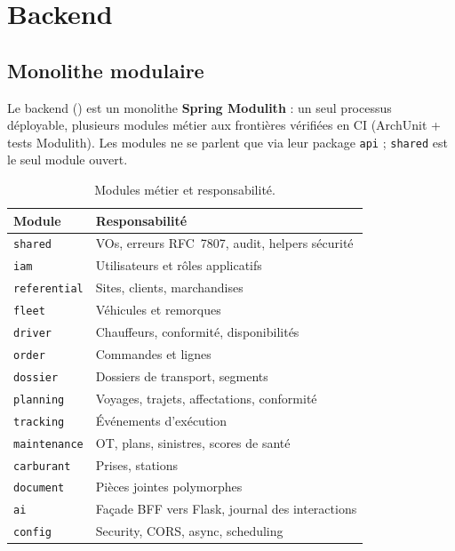 \chapter{Backend}
\label{chap:backend}

\section{Monolithe modulaire}

Le backend () est un monolithe \textbf{Spring Modulith} : un seul processus déployable, plusieurs modules métier aux frontières vérifiées en CI (ArchUnit + tests Modulith). Les modules ne se parlent que via leur package \texttt{api} ; \texttt{shared} est le seul module ouvert.


\begin{table}[ht]
\centering
\caption{Modules métier et responsabilité.}
\label{tab:modules}
\begin{tabular}{@{}lp{8.2cm}@{}}
\toprule
Module & Responsabilité \\
\midrule
\texttt{shared} & VOs, erreurs RFC~7807, audit, helpers sécurité \\
\texttt{iam} & Utilisateurs et rôles applicatifs \\
\texttt{referential} & Sites, clients, marchandises \\
\texttt{fleet} & Véhicules et remorques \\
\texttt{driver} & Chauffeurs, conformité, disponibilités \\
\texttt{order} & Commandes et lignes \\
\texttt{dossier} & Dossiers de transport, segments \\
\texttt{planning} & Voyages, trajets, affectations, conformité \\
\texttt{tracking} & Événements d'exécution \\
\texttt{maintenance} & OT, plans, sinistres, scores de santé \\
\texttt{carburant} & Prises, stations \\
\texttt{document} & Pièces jointes polymorphes \\
\texttt{ai} & Façade BFF vers Flask, journal des interactions \\
\texttt{config} & Security, CORS, async, scheduling \\
\bottomrule
\end{tabular}
\end{table}

